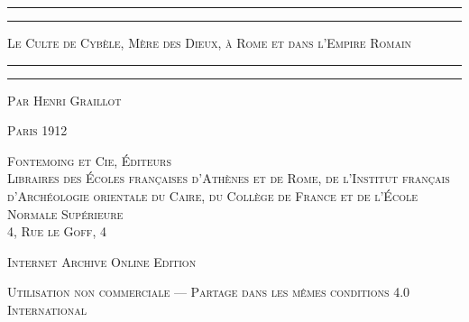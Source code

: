 \documentclass[a4paper, 11pt, oneside, polutonikogreek, french]{article}
\begin{document}
\begin{titlepage} %
	\centering %

	
	\rule{\textwidth}{1.6pt}\vspace*{-\baselineskip}\vspace*{2pt} %
	\rule{\textwidth}{0.4pt} %
	
	\vspace{1\baselineskip} %
	
	{\scshape\Huge Le Culte de Cybèle, Mère des Dieux, à Rome et dans l'Empire Romain}
	
	\vspace{1\baselineskip} %

	\rule{\textwidth}{0.4pt}\vspace*{-\baselineskip}\vspace{3.2pt} %
	\rule{\textwidth}{1.6pt} %
	
	\vspace{1\baselineskip} %
	
	
	{\scshape \Large Par Henri Graillot} %
	
	\vspace*{1\baselineskip} %
	
        {\scshape\scriptsize } %
    
        \vspace*{\fill}

	\vspace{1\baselineskip}

	{\small\scshape Paris 1912}
	
	{\small\scshape{Fontemoing et Cie, Éditeurs \\Libraires des Écoles françaises d'Athènes et de Rome, de l'Institut français d'Archéologie orientale du Caire, du Collège de France et de l'École Normale Supérieure \\4, Rue le Goff, 4}}
	
	\vspace{0.5\baselineskip} %

        \scshape Internet Archive Online Edition  %
	
	{\scshape\small Utilisation non commerciale --- Partage dans les mêmes conditions 4.0 International} %
\end{titlepage}
\setlength{\parskip}{1mm plus1mm minus1mm}
\clearpage
\end{document}
